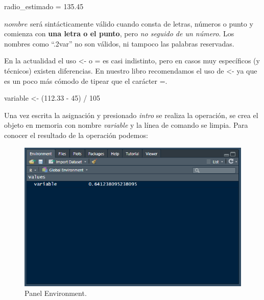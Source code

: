 \documentclass[
]{book}
\newenvironment{Shaded}{\begin{snugshade}}{\end{snugshade}}
\newcommand{\DecValTok}[1]{\textcolor[rgb]{0.00,0.00,0.81}{#1}}
\newcommand{\FloatTok}[1]{\textcolor[rgb]{0.00,0.00,0.81}{#1}}
\newcommand{\NormalTok}[1]{#1}
\newcommand{\OtherTok}[1]{\textcolor[rgb]{0.56,0.35,0.01}{#1}}
\newcommand{\SpecialCharTok}[1]{\textcolor[rgb]{0.00,0.00,0.00}{#1}}
\begin{document}
\begin{Shaded}
\begin{Highlighting}[]
\NormalTok{radio\_estimado }\OtherTok{=} \FloatTok{135.45}
\end{Highlighting}
\end{Shaded}

\(nombre\) será sintácticamente válido cuando consta de letras, números o punto y comienza con \textbf{una letra o el punto}, pero \emph{no seguido de un número}. Los nombres como ``.2var'' no son válidos, ni tampoco las palabras reservadas.

En la actualidad el uso \index{<-}\textless- o = es casi indistinto, pero en casos muy específicos (y técnicos) existen diferencias. En nuestro libro recomendamos el uso de \textless- ya que es un poco más cómodo de tipear que el carácter =.

\begin{Shaded}
\begin{Highlighting}[]
\NormalTok{variable }\OtherTok{\textless{}{-}}\NormalTok{ (}\FloatTok{112.33} \SpecialCharTok{{-}} \DecValTok{45}\NormalTok{) }\SpecialCharTok{/} \DecValTok{105}
\end{Highlighting}
\end{Shaded}

Una vez escrita la asignación y presionado \emph{intro} se realiza la operación, se crea el objeto en memoria con nombre \emph{variable} y la línea de comando se limpia. Para conocer el resultado de la operación podemos:

\begin{figure}

{\centering \includegraphics[width=8.49in]{img/enviroment} 

}

\caption{Panel Environment.}\label{fig:img-lan-1}
\end{figure}
\end{document}
